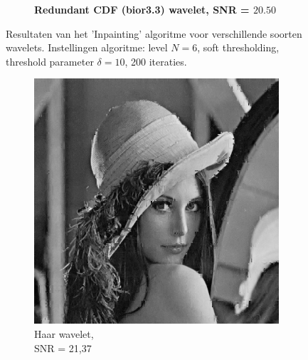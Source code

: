 \begin{figure}
\begin{subfigure}[b]{0.4\textwidth}
        \caption{\textbf{ Redundant CDF (bior3.3) wavelet, SNR = $\mathbf{20.50}$} }
        \label{fig:matti_fig_rwt_bior33}
    \end{subfigure}
    \caption{Resultaten van het 'Inpainting' algoritme voor verschillende soorten wavelets. Instellingen algoritme: level $N = 6$, soft thresholding, threshold parameter $\delta = 10$, 200 iteraties.}\label{fig:matti_fig_rwt}
\end{figure}


\begin{figure}
    \centering
    \begin{subfigure}[b]{0.4\textwidth}
        \includegraphics[width=\textwidth]{../src/inpainting/vraag_2_4_haar}
        \caption{Haar wavelet, \\ SNR = 21,37 }
        \label{fig:matti_fig_haar}
    \end{subfigure}
    ~ %
    \begin{subfigure}[b]{0.4\textwidth}

\end{subfigure}
\end{figure}
